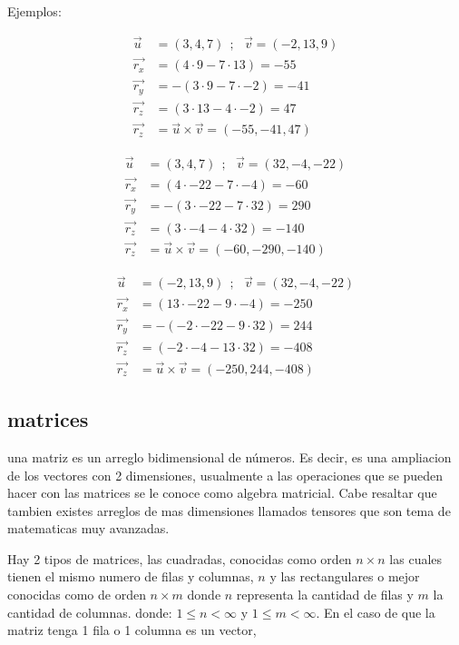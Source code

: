     Ejemplos:

    \begin{align*}
        \vec{u}& =(3,4,7)   \ \ ;\ \ \  \vec{v} =(-2,13,9)		\\
        \vec{r_x}& = (4\cdot 9- 7\cdot 13) = -55 \\
        \vec{r_y}&= -(3\cdot 9- 7\cdot -2)= -41 \\
        \vec{r_z}&= (3\cdot 13- 4\cdot -2) = 47 \\
        \vec{r_z}&= \vec{u}\times\vec{v} = (-55,-41,47)
    \end{align*}

    \begin{align*}
        \vec{u}& =(3,4,7)  \ \ ;\ \ \  \vec{v} =(32,-4,-22)		\\
        \vec{r_x}& = (4\cdot -22 - 7\cdot -4)= -60\\
        \vec{r_y}&= -(3\cdot -22- 7\cdot 32) =290\\
        \vec{r_z}&= (3\cdot -4- 4\cdot 32) = -140\\
        \vec{r_z}&= \vec{u}\times\vec{v} = (-60,-290,-140)
    \end{align*}

    \begin{align*}
        \vec{u}& =(-2,13,9)  \ \ ;\ \ \   \vec{v} =(32,-4,-22)		\\
        \vec{r_x}& = (13\cdot -22- 9\cdot -4)= -250\\
        \vec{r_y}&= -(-2\cdot -22- 9\cdot 32)= 244\\
        \vec{r_z}&= (-2\cdot -4- 13\cdot 32) =-408\\
        \vec{r_z}&= \vec{u}\times\vec{v} = (-250, 244, -408)
    \end{align*}




\subsection{matrices}

una matriz es un arreglo bidimensional de números. Es decir, es una ampliacion de
los vectores con 2 dimensiones, usualmente a las operaciones que se pueden hacer
con las matrices se le conoce como algebra matricial. Cabe resaltar que tambien
existes arreglos de mas dimensiones llamados tensores que son tema de matematicas
muy avanzadas.

Hay 2 tipos de matrices, las cuadradas, conocidas como orden $n\times n$ las
cuales tienen el mismo numero de filas y columnas, $n$
y las rectangulares o mejor conocidas como de orden $n\times m$ donde $n$
representa la cantidad de filas y $m$ la cantidad de columnas. donde:
$ 1\leq  n < \infty$ y  $ 1\leq m < \infty$.
En el caso de que la matriz tenga 1 fila o 1 columna es un vector,

